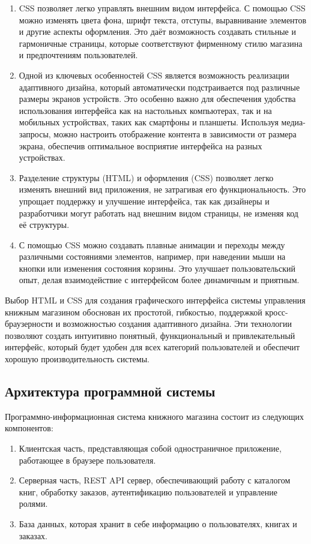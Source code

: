 \begin{enumerate}
	\item CSS позволяет легко управлять внешним видом интерфейса. С помощью CSS можно изменять цвета фона, шрифт текста, отступы, выравнивание элементов и другие аспекты оформления. Это даёт возможность создавать стильные и гармоничные страницы, которые соответствуют фирменному стилю магазина и предпочтениям пользователей.
	\item Одной из ключевых особенностей CSS является возможность реализации адаптивного дизайна, который автоматически подстраивается под различные размеры экранов устройств. Это особенно важно для обеспечения удобства использования интерфейса как на настольных компьютерах, так и на мобильных устройствах, таких как смартфоны и планшеты. Используя медиа-запросы, можно настроить отображение контента в зависимости от размера экрана, обеспечив оптимальное восприятие интерфейса на разных устройствах.
	\item Разделение структуры (HTML) и оформления (CSS) позволяет легко изменять внешний вид приложения, не затрагивая его функциональность. Это упрощает поддержку и улучшение интерфейса, так как дизайнеры и разработчики могут работать над внешним видом страницы, не изменяя код её структуры.
	\item С помощью CSS можно создавать плавные анимации и переходы между различными состояниями элементов, например, при наведении мыши на кнопки или изменения состояния корзины. Это улучшает пользовательский опыт, делая взаимодействие с интерфейсом более динамичным и приятным.
\end{enumerate}


Выбор HTML и CSS для создания графического интерфейса системы управления книжным магазином обоснован их простотой, гибкостью, поддержкой кросс-браузерности и возможностью создания адаптивного дизайна. Эти технологии позволяют создать интуитивно понятный, функциональный и привлекательный интерфейс, который будет удобен для всех категорий пользователей и обеспечит хорошую производительность системы.


\subsection{Архитектура программной системы}

Программно-информационная система книжного магазина состоит из следующих компонентов:

\begin{enumerate}
	\item Клиентская часть, представляющая собой одностраничное приложение, работающее в браузере пользователя. 
	\item Серверная часть, REST API сервер, обеспечивающий работу с каталогом книг, обработку заказов, аутентификацию пользователей и управление ролями.
	\item База данных, которая хранит в себе информацию о пользователях, книгах и заказах. 
\end{enumerate}

